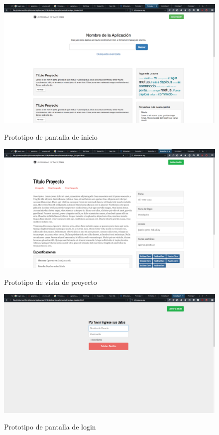 
\begin{figure}[!ht]
\includegraphics[width=\textwidth]{images/proto/1}
\label{FIG:PROTO_1}
\caption{Prototipo de pantalla de inicio}
\end{figure}

\begin{figure}[!ht]
\includegraphics[width=\textwidth]{images/proto/2}
\label{FIG:PROTO_2}
\caption{Prototipo de vista de proyecto}
\end{figure}

\begin{figure}[!ht]
\includegraphics[width=\textwidth]{images/proto/3}
\label{FIG:PROTO_3}
\caption{Prototipo de pantalla de login}
\end{figure}

